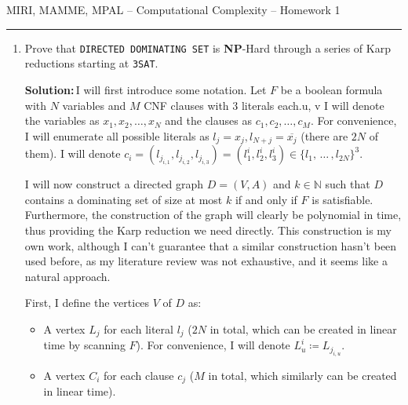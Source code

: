 \documentclass{amsart}
\theoremstyle{plain}
\theoremstyle{definition}
\newcommand{\N}{\mathbb{N}}
\newcommand{\np}{\textbf{NP}}
\newcommand{\sol}{\textbf{Solution:\,}}
\begin{document}
    {\Large MIRI, MAMME, MPAL -- Computational Complexity -- Homework 1}

    \vspace{0.5cm}

    \hrule

    \vspace{0.5cm}

    \begin{enumerate}[label=\textbf{Exercise \arabic*:}, leftmargin=0cm, labelwidth=-0.2cm, align=left]

        \item
            Prove that \verb|DIRECTED DOMINATING SET| is \np-Hard through a series of Karp reductions
            starting at \verb|3SAT|.

            \sol I will first introduce some notation.
            Let $F$ be a boolean formula with $N$ variables and $M$ CNF
            clauses with $3$ literals each.u,  v
            I will denote the variables as $x_1, x_2, \ldots, x_N$ and the clauses as $c_1, c_2, \ldots, c_M$.
            For convenience, I will enumerate all possible literals as $l_j = x_j, l_{N+j} = \overline{x_j}$
            (there are $2N$ of them).
            I will denote
            $c_i = \left( l_{j_{i, 1}}, l_{j_{i, 2}}, l_{j_{i, 3}} \right) =
            \left( l^i_1, l^i_2, l^i_3 \right)
            \in \{l_1, \, \dots \, , l_{2N}\}^3$.

            I will now construct a directed graph $D = (V, A)$ and $k \in \N$ such that
            $D$ contains a dominating set of size at most $k$ if and only if $F$ is satisfiable.
            Furthermore, the construction of the graph will clearly be polynomial in time,
            thus providing the Karp reduction we need directly.
            This construction is my own work, although I can't guarantee that
            a similar construction hasn't been used before, as my literature review was not exhaustive,
            and it seems like a natural approach.


            First, I define the vertices $V$ of $D$ as:
            \begin{itemize}
                \item A vertex $L_j$ for each literal $l_j$
                ($2N$ in total, which can be created in linear time by scanning $F$).
                For convenience, I will denote $L^i_u \coloneqq L_{j_{i, u}}$.

                \item A vertex $C_i$ for each clause $c_j$ ($M$ in total, which similarly can be created in linear time).


\end{itemize}
\end{enumerate}
\end{document}
